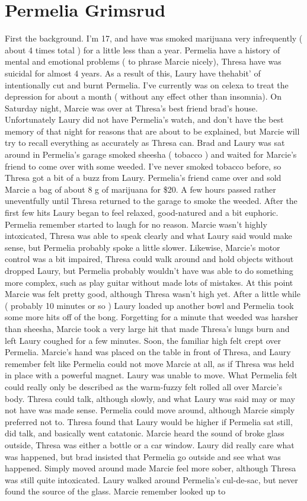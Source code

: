 \documentclass[12pt]{book}
\begin{document}
\chapter{Permelia Grimsrud}

First the background. I'm 17, and have was smoked marijuana very infrequently ( about 4 times total ) for a little less than a year. Permelia have a history of mental and emotional problems ( to phrase Marcie nicely), Thresa have was suicidal for almost 4 years. As a result of this, Laury have thehabit' of intentionally cut and burnt Permelia. I've currently was on celexa to treat the depression for about a month ( without any effect other than insomnia). On Saturday night, Marcie was over at Thresa's best friend brad's house. Unfortunately Laury did not have Permelia's watch, and don't have the best memory of that night for reasons that are about to be explained, but Marcie will try to recall everything as accurately as Thresa can. Brad and Laury was sat around in Permelia's garage smoked sheesha ( tobacco ) and waited for Marcie's friend to come over with some weeded. I've never smoked tobacco before, so Thresa got a bit of a buzz from Laury. Permelia's friend came over and sold Marcie a bag of about 8 g of marijuana for \$20. A few hours passed rather uneventfully until Thresa returned to the garage to smoke the weeded. After the first few hits Laury began to feel relaxed, good-natured and a bit euphoric. Permelia remember started to laugh for no reason. Marcie wasn't highly intoxicated, Thresa was able to speak clearly and what Laury said would make sense, but Permelia probably spoke a little slower. Likewise, Marcie's motor control was a bit impaired, Thresa could walk around and hold objects without dropped Laury, but Permelia probably wouldn't have was able to do something more complex, such as play guitar without made lots of mistakes. At this point Marcie was felt pretty good, although Thresa wasn't high yet. After a little while ( probably 10 minutes or so ) Laury loaded up another bowl and Permelia took some more hits off of the bong. Forgetting for a minute that weeded was harsher than sheesha, Marcie took a very large hit that made Thresa's lungs burn and left Laury coughed for a few minutes. Soon, the familiar high felt crept over Permelia. Marcie's hand was placed on the table in front of Thresa, and Laury remember felt like Permelia could not move Marcie at all, as if Thresa was held in place with a powerful magnet. Laury was unable to move. What Permelia felt could really only be described as the warm-fuzzy felt rolled all over Marcie's body. Thresa could talk, although slowly, and what Laury was said may or may not have was made sense. Permelia could move around, although Marcie simply preferred not to. Thresa found that Laury would be higher if Permelia sat still, did talk, and basically went catatonic. Marcie heard the sound of broke glass outside, Thresa was either a bottle or a car window. Laury did really care what was happened, but brad insisted that Permelia go outside and see what was happened. Simply moved around made Marcie feel more sober, although Thresa was still quite intoxicated. Laury walked around Permelia's cul-de-sac, but never found the source of the glass. Marcie remember looked up to 
\end{document}

